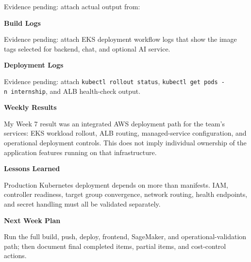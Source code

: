 Evidence pending: attach actual output from:

\begin{Shaded}
\begin{Highlighting}[]
 \OperatorTok{\textless{}}\OperatorTok{\textgreater{}}
\end{Highlighting}
\end{Shaded}

\vspace{0.5em}\noindent\textbf{Build Logs}\par

Evidence pending: attach EKS deployment workflow logs that show the
image tags selected for backend, chat, and optional AI service.

\vspace{0.5em}\noindent\textbf{Deployment Logs}\par

Evidence pending: attach \texttt{kubectl\ rollout\ status},
\texttt{kubectl\ get\ pods\ -n\ internship}, and ALB health-check
output.

\vspace{0.5em}\noindent\textbf{Weekly Results}\par

My Week 7 result was an integrated AWS deployment path for the team's
services: EKS workload rollout, ALB routing, managed-service
configuration, and operational deployment controls. This does not imply
individual ownership of the application features running on that
infrastructure.

\vspace{0.5em}\noindent\textbf{Lessons Learned}\par

Production Kubernetes deployment depends on more than manifests. IAM,
controller readiness, target group convergence, network routing, health
endpoints, and secret handling must all be validated separately.

\vspace{0.5em}\noindent\textbf{Next Week Plan}\par

Run the full build, push, deploy, frontend, SageMaker, and
operational-validation path; then document final completed items,
partial items, and cost-control actions.

